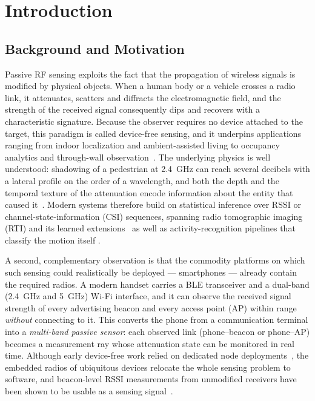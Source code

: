 \documentclass[journal,10pt]{IEEEtran}
\begin{document}
\section{Introduction}
\subsection{Background and Motivation}
Passive RF sensing exploits the fact that the propagation of wireless signals
is modified by physical objects. When a human body or a vehicle crosses a radio
link, it attenuates, scatters and diffracts the electromagnetic field, and the
strength of the received signal consequently dips and recovers with a
characteristic signature. Because the observer requires no device attached to
the target, this paradigm is called device-free sensing, and it underpins
applications ranging from indoor localization and ambient-assisted living to
occupancy analytics and through-wall observation~\cite{wilson2010}. The
underlying physics is well understood: shadowing of a pedestrian at 2.4~GHz can
reach several decibels with a lateral profile on the order of a wavelength, and
both the depth and the temporal texture of the attenuation encode information
about the entity that caused it~\cite{januszkiewicz2018}. Modern systems
therefore build on statistical inference over RSSI or channel-state-information
(CSI) sequences, spanning radio tomographic imaging (RTI) and its learned
extensions~\cite{alippi2016,li2024,wu2024,cnnrti2025} as well as
activity-recognition pipelines that classify the motion itself
\cite{wong2024,sanchez2020}.

A second, complementary observation is that the commodity platforms on which
such sensing could realistically be deployed --- smartphones --- already
contain the required radios. A modern handset carries a BLE transceiver and a
dual-band (2.4~GHz and 5~GHz) Wi-Fi interface, and it can observe the received
signal strength of every advertising beacon and every access point (AP) within
range \emph{without} connecting to it. This converts the phone from a
communication terminal into a \emph{multi-band passive sensor}: each observed
link (phone--beacon or phone--AP) becomes a measurement ray whose attenuation
state can be monitored in real time. Although early device-free work relied on
dedicated node deployments~\cite{wilson2010,alippi2016}, the embedded radios of
ubiquitous devices relocate the whole sensing problem to software, and
beacon-level RSSI measurements from unmodified receivers have been shown to be
usable as a sensing signal~\cite{ramirez2021,milano2024,bai2020}.
\end{document}
